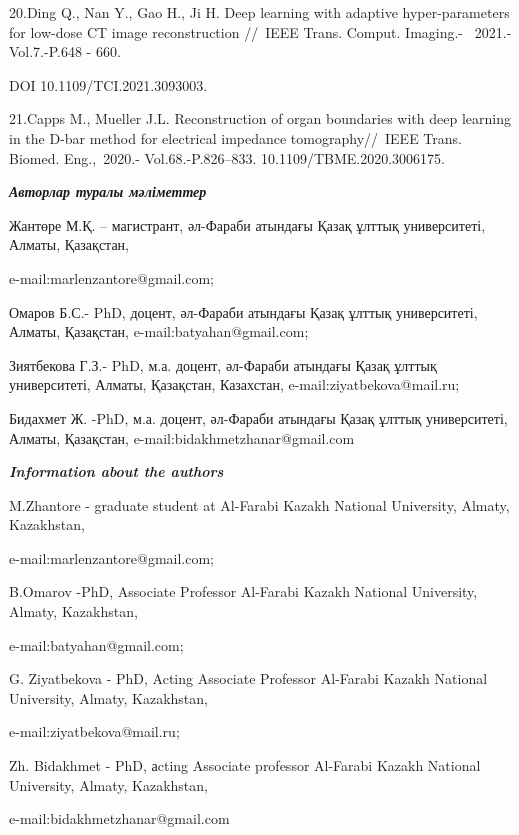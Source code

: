 20.Ding Q., Nan Y., Gao H., Ji H. Deep learning with adaptive
hyper-parameters for low-dose CT image reconstruction //~IEEE Trans.
Comput. Imaging.- \emph{~}2021.-Vol.7.-P.648 - 660.

DOI 10.1109/TCI.2021.3093003.~

21.Capps M., Mueller J.L. Reconstruction of organ boundaries with deep
learning in the D-bar method for electrical impedance tomography//~IEEE
Trans. Biomed. Eng.,\emph{~}2020.- Vol.68.-P.826--833.
10.1109/TBME.2020.3006175.~

\emph{\textbf{Авторлар туралы мәліметтер}}

Жантөре М.Қ. -- магистрант, әл-Фараби атындағы Қазақ ұлттық
университеті, Алматы, Қазақстан,

e-mail:marlenzantore@gmail.com;

Омаров Б.С.- PhD, доцент, әл-Фараби атындағы Қазақ ұлттық университеті,
Алматы, Қазақстан, e-mail:batyahan@gmail.com;

Зиятбекова Г.З.- PhD, м.а. доцент, әл-Фараби атындағы Қазақ ұлттық
университеті, Алматы, Қазақстан, Казахстан, e-mail:ziyatbekova@mail.ru;

Бидахмет Ж. -PhD, м.а. доцент, әл-Фараби атындағы Қазақ ұлттық
университеті, Алматы, Қазақстан, e-mail:bidakhmetzhanar@gmail.com

\emph{\textbf{Information about the authors}}

M.Zhantore - graduate student at Al-Farabi Kazakh National University,
Almaty, Kazakhstan,

e-mail:marlenzantore@gmail.com;

B.Omarov -PhD, Associate Professor Al-Farabi Kazakh National University,
Almaty, Kazakhstan,

e-mail:batyahan@gmail.com;

G. Ziyatbekova - PhD, Acting Associate Professor Al-Farabi Kazakh
National University, Almaty, Kazakhstan,

e-mail:ziyatbekova@mail.ru;

Zh. Bidakhmet - PhD, аcting Associate professor Al-Farabi Kazakh
National University, Almaty, Kazakhstan,

e-mail:bidakhmetzhanar@gmail.com
